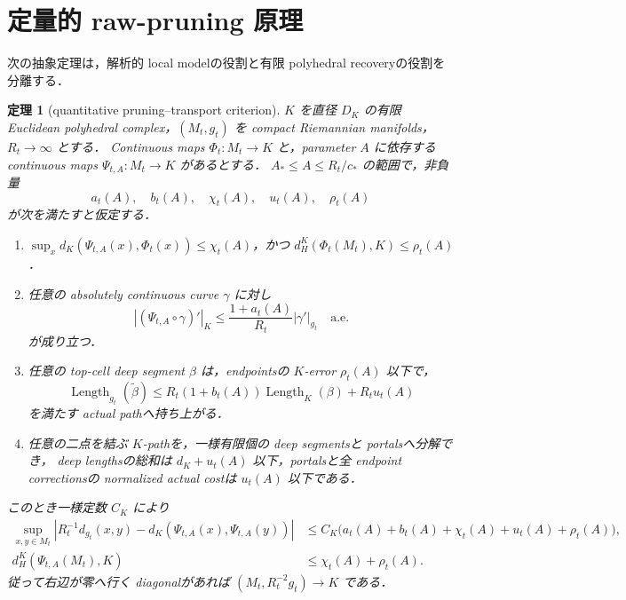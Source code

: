 \documentclass[a4paper,11pt]{ltjsarticle}
\numberwithin{equation}{section}
\theoremstyle{plain}
\newtheorem{theorem}{定理}[section]
\theoremstyle{definition}
\theoremstyle{remark}
\newcommand{\Length}{\operatorname{Length}}
\begin{document}
\section{定量的 raw-pruning 原理}\label{sec:general-principle}

次の抽象定理は，解析的 local modelの役割と有限 polyhedral recoveryの役割を分離する．

\begin{theorem}[quantitative pruning--transport criterion]\label{thm:abstract-pruning}
$K$ を直径 $D_K$ の有限 Euclidean polyhedral complex，$(M_t,g_t)$ を compact Riemannian manifolds，$R_t\to\infty$ とする．
Continuous maps $\Phi_t:M_t\to K$ と，parameter $A$ に依存する continuous maps $\Psi_{t,A}:M_t\to K$ があるとする．
$A_*\le A\le R_t/c_*$ の範囲で，非負量
\[
 a_t(A),\quad b_t(A),\quad \chi_t(A),\quad u_t(A),\quad \rho_t(A)
\]
が次を満たすと仮定する．
\begin{enumerate}[label=\textup{(A\arabic*)}]
\item $\sup_xd_K(\Psi_{t,A}(x),\Phi_t(x))\le\chi_t(A)$，かつ
      $d_H^K(\Phi_t(M_t),K)\le\rho_t(A)$．
\item 任意の absolutely continuous curve $\gamma$ に対し
      \[
       |(\Psi_{t,A}\circ\gamma)'|_K
       \le\frac{1+a_t(A)}{R_t}|\gamma'|_{g_t}
       \quad\text{a.e.}
      \]
      が成り立つ．
\item 任意の top-cell deep segment $\beta$ は，endpointsの $K$-error $\rho_t(A)$ 以下で，
      \[
       \Length_{g_t}(\widetilde\beta)
       \le R_t(1+b_t(A))\Length_K(\beta)+R_tu_t(A)
      \]
      を満たす actual pathへ持ち上がる．
\item 任意の二点を結ぶ $K$-pathを，一様有限個の deep segmentsと portalsへ分解でき，
      deep lengthsの総和は $d_K+u_t(A)$ 以下，portalsと全 endpoint correctionsの normalized actual costは $u_t(A)$ 以下である．
\end{enumerate}
このとき一様定数 $C_K$ により
\begin{align}
 \sup_{x,y\in M_t}
 \left|R_t^{-1}d_{g_t}(x,y)-d_K(\Psi_{t,A}(x),\Psi_{t,A}(y))\right|
 &\le C_K\bigl(a_t(A)+b_t(A)+\chi_t(A)+u_t(A)+\rho_t(A)\bigr),
 \label{eq:abstract-distortion}\\
 d_H^K(\Psi_{t,A}(M_t),K)
 &\le\chi_t(A)+\rho_t(A).
 \label{eq:abstract-density}
\end{align}
従って右辺が零へ行く diagonalがあれば $(M_t,R_t^{-2}g_t)\to K$ である．
\end{theorem}
\end{document}
